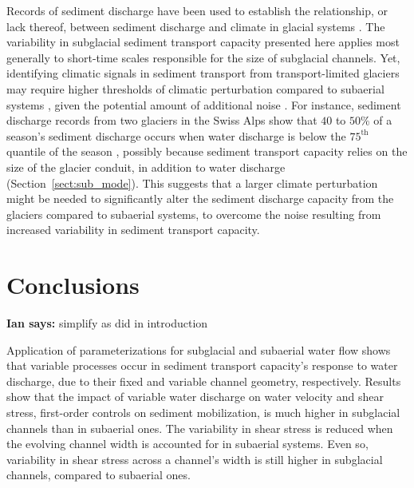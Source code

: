 \documentclass[11pt]{article}
\newcommand{\ian}[1]{{\textbf{\color{blue}Ian says:} \color{blue} #1} }
\begin{document}
\begin{spacing}{1}
  Records of sediment discharge have been used to establish the relationship, or lack thereof, between sediment discharge and climate in glacial systems \citep[e.g.][]{koppes2009a,willenbring2016,mariotti2021}.
  The variability in subglacial sediment transport capacity presented here applies most generally to short-time scales responsible for the size of subglacial channels.
  Yet, identifying climatic signals in sediment transport from transport-limited glaciers may require higher thresholds of climatic perturbation compared to subaerial systems \citep{tofelde2021}, given the potential amount of additional noise \citep{castletort2003,jerolmack2010,romans2016}.
  For instance, sediment discharge records from two glaciers in the Swiss Alps show that $40$ to $50$\% of a season's sediment discharge occurs when water discharge is below the $75^{\mathrm{th}}$ quantile of the season \citep{delaney2018}, possibly because sediment transport capacity relies on the size of the glacier conduit, in addition to water discharge (Section~\ref{sect:sub_mode}).
  This suggests that a larger climate perturbation might be needed to significantly alter the sediment discharge capacity from the glaciers compared to subaerial systems, to overcome the noise resulting from increased variability in sediment transport capacity.

  \section{Conclusions}
  
  \ian{simplify as did in introduction}
  
  Application of parameterizations for subglacial and subaerial water flow shows that variable processes occur in sediment transport capacity's response to water discharge, due to their fixed and variable channel geometry, respectively.
  Results show that the impact of variable water discharge on water velocity and shear stress, first-order controls on sediment mobilization, is much higher in subglacial channels than in subaerial ones.
  The variability in shear stress is reduced when the evolving channel width is accounted for in subaerial systems.
  Even so, variability in shear stress across a channel's width is still higher in subglacial channels, compared to subaerial ones.
  

\end{spacing}
\end{document}
